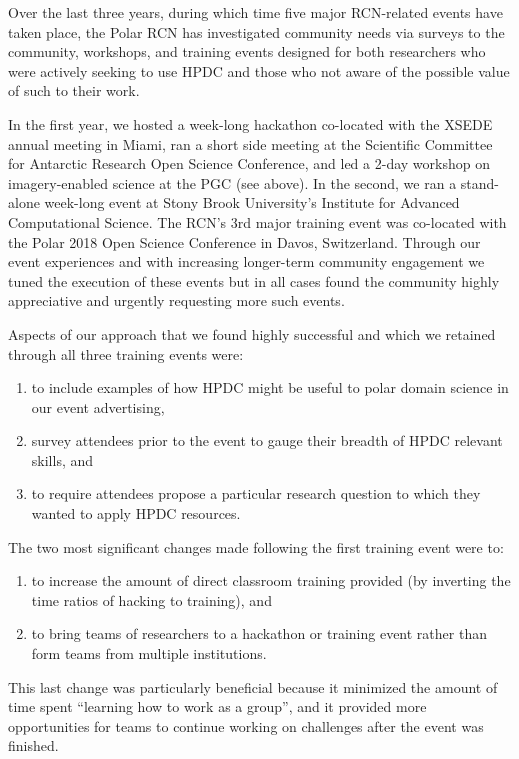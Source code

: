 \documentclass[10pt,letterpaper,draft]{article}
\begin{document}
Over the last three years, during which time five major RCN-related events have taken place, the Polar RCN has investigated community needs via surveys to the community, workshops, and training events designed for both researchers who were actively seeking to use HPDC and those who not aware of the possible value of such to their work.

In the first year, we hosted a week-long hackathon co-located with the XSEDE annual meeting in Miami, ran a short side meeting at the Scientific Committee for Antarctic Research Open Science Conference, and led a 2-day workshop on imagery-enabled science at the PGC (see above). In the second, we ran a stand-alone week-long event at Stony Brook University's Institute for Advanced Computational Science. The RCN's 3rd major training event was co-located with the Polar 2018 Open Science Conference in Davos, Switzerland. Through our event experiences and with increasing longer-term community engagement we tuned the execution of these events but in all cases found the community highly appreciative and urgently requesting more such events.

Aspects of our approach that we found highly successful and which we retained through all three training events were:

\begin{enumerate}
    \item to include examples of how HPDC might be useful to polar domain science in our event advertising,
\item survey attendees prior to the event to gauge their breadth of HPDC relevant skills, and
\item to require attendees propose a particular research question to which they wanted to apply HPDC resources.
\end{enumerate}

The two most significant changes made following the first training event were to:
\begin{enumerate}
    \item to increase the amount of direct classroom training provided (by inverting the time ratios of hacking to training), and
\item to bring teams of researchers to a hackathon or training event rather than form teams from multiple institutions.
\end{enumerate}

This last change was particularly beneficial because it minimized the amount of time spent ``learning how to work as a group'', and it provided more opportunities for teams to continue working on challenges after the event was finished.
\end{document}

